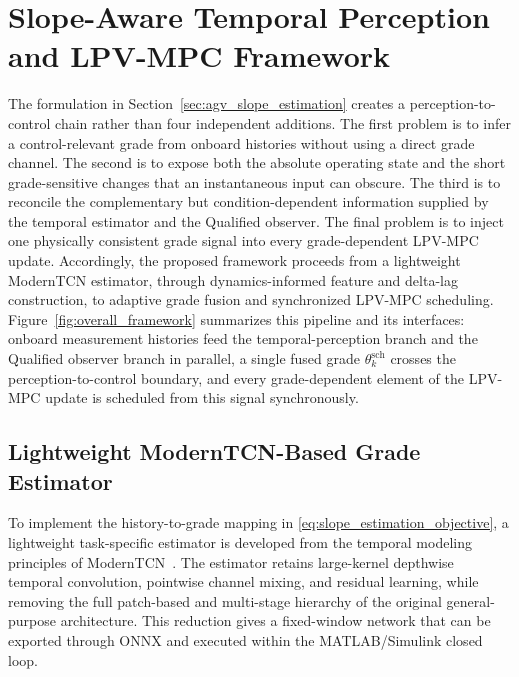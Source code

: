 \documentclass{ieeeaccess}
\newcommand{\citep}[1]{\cite{#1}}
\begin{document}
\section{Slope-Aware Temporal Perception and LPV-MPC Framework}
\label{sec:proposed_framework}

The formulation in Section~\ref{sec:agv_slope_estimation} creates a perception-to-control chain rather than four independent additions. The first problem is to infer a control-relevant grade from onboard histories without using a direct grade channel. The second is to expose both the absolute operating state and the short grade-sensitive changes that an instantaneous input can obscure. The third is to reconcile the complementary but condition-dependent information supplied by the temporal estimator and the Qualified observer. The final problem is to inject one physically consistent grade signal into every grade-dependent LPV-MPC update. Accordingly, the proposed framework proceeds from a lightweight ModernTCN estimator, through dynamics-informed feature and delta-lag construction, to adaptive grade fusion and synchronized LPV-MPC scheduling. Figure~\ref{fig:overall_framework} summarizes this pipeline and its interfaces: onboard measurement histories feed the temporal-perception branch and the Qualified observer branch in parallel, a single fused grade $\theta_k^{\mathrm{sch}}$ crosses the perception-to-control boundary, and every grade-dependent element of the LPV-MPC update is scheduled from this signal synchronously.

\subsection{Lightweight ModernTCN-Based Grade Estimator}

To implement the history-to-grade mapping in \eqref{eq:slope_estimation_objective}, a lightweight task-specific estimator is developed from the temporal modeling principles of ModernTCN~\citep{Luo2024ModernTCN}. The estimator retains large-kernel depthwise temporal convolution, pointwise channel mixing, and residual learning, while removing the full patch-based and multi-stage hierarchy of the original general-purpose architecture. This reduction gives a fixed-window network that can be exported through ONNX and executed within the MATLAB/Simulink closed loop.
\end{document}
